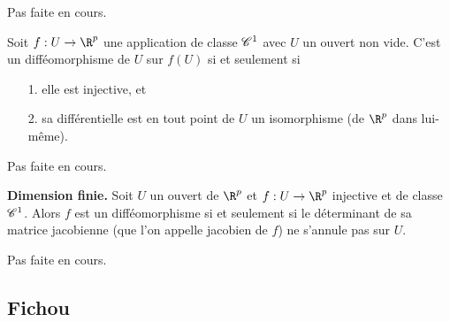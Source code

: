 \documentclass[12pt, class=report,crop=false]{standalone}
\begin{document}
 Pas faite en cours.

\begin{corollaire}
 \textcolor[rgb]{0.44,0.00,0.87}{
  Soit $f: U \rightarrow \R^p$ une application de classe $\mathscr{C}^1$ avec $U$ un ouvert
non vide. C'est un diff\'eomorphisme de $U$ sur $f(U)$ si et seulement si
\begin{itemize}
  \item[1.] elle est injective, et
  \item[2.] sa diff\'erentielle est en tout point de $U$ un isomorphisme  (de $\R^p$ dans lui-même).
\end{itemize}}
\end{corollaire}

 Pas faite en cours.

\begin{corollaire} \textcolor[rgb]{0.44,0.00,0.87}{ \textbf{Dimension finie.}
  Soit $U$ un ouvert de $\R^p$ et $f: U \rightarrow \R^p$ injective et de classe $\mathscr{C}^1$.
Alors $f$ est un diff\'eomorphisme si et seulement si le d\'eterminant de sa matrice jacobienne
(que l'on appelle jacobien de $f$) ne s'annule pas sur $U$.}
\end{corollaire}

 Pas faite en cours.


\subsection{Fichou}
\end{document}
